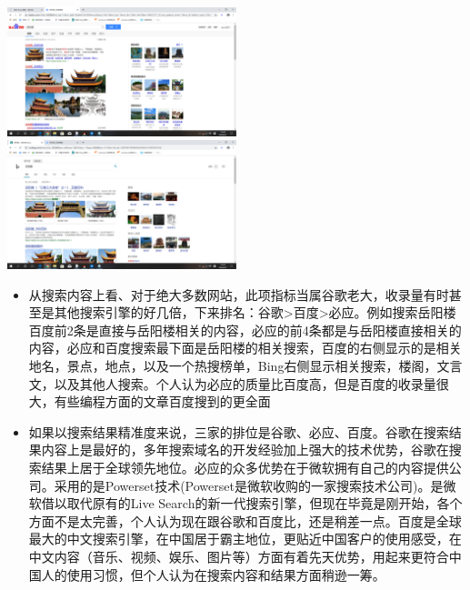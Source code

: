 \documentclass[a4paper,12pt]{report}
\begin{document}
\begin{center}%
    \includegraphics[width=0.5\textwidth]{1.png} %
    \includegraphics[width=0.5\textwidth]{2.png} %
\end{center}

\begin{itemize}
    \item 
从搜索内容上看、对于绝大多数网站，此项指标当属谷歌老大，收录量有时甚至是其他搜索引擎的好几倍，下来排名：谷歌>百度>必应。例如搜索岳阳楼百度前2条是直接与岳阳楼相关的内容，必应的前4条都是与岳阳楼直接相关的内容，必应和百度搜索最下面是岳阳楼的相关搜索，百度的右侧显示的是相关地名，景点，地点，以及一个热搜榜单，Bing右侧显示相关搜索，楼阁，文言文，以及其他人搜索。个人认为必应的质量比百度高，但是百度的收录量很大，有些编程方面的文章百度搜到的更全面
\end{itemize}


\begin{itemize}
    \item 
如果以搜索结果精准度来说，三家的排位是谷歌、必应、百度。谷歌在搜索结果内容上是最好的，多年搜索域名的开发经验加上强大的技术优势，谷歌在搜索结果上居于全球领先地位。必应的众多优势在于微软拥有自己的内容提供公司。采用的是Powerset技术(Powerset是微软收购的一家搜索技术公司)。是微软借以取代原有的Live Search的新一代搜索引擎，但现在毕竟是刚开始，各个方面不是太完善，个人认为现在跟谷歌和百度比，还是稍差一点。百度是全球最大的中文搜索引擎，在中国居于霸主地位，更贴近中国客户的使用感受，在中文内容（音乐、视频、娱乐、图片等）方面有着先天优势，用起来更符合中国人的使用习惯，但个人认为在搜索内容和结果方面稍逊一筹。 
\end{itemize}

\end{document}
